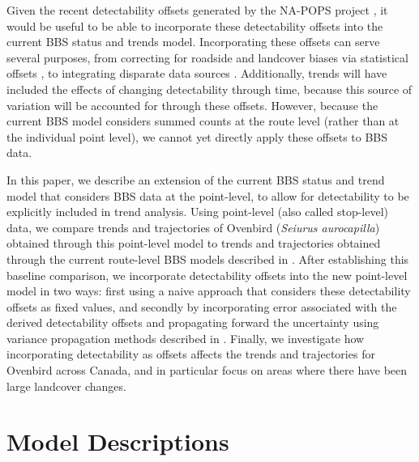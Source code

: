 \documentclass[12pt]{article}
\begin{document}
Given the recent detectability offsets generated by the NA-POPS project \citep{edwards_point_2023}, it would be useful to be able to incorporate these detectability offsets into the current BBS status and trends model. 
Incorporating these offsets can serve several purposes, from correcting for roadside and landcover biases via statistical offsets \citep{thogmartin_sensitivity_2010, solymos_lessons_2020, edwards_point_2023}, to integrating disparate data sources \citep{solymos_calibrating_2013, edwards_point_2023}.
Additionally, trends will have included the effects of changing detectability through time, because this source of variation will be accounted for through these offsets.
However, because the current BBS model considers summed counts at the route level (rather than at the individual point level), we cannot yet directly apply these offsets to BBS data. 

\par In this paper, we describe an extension of the current BBS status and trend model \citep{smith_spatially_2023} that considers BBS data at the point-level, to allow for detectability to be explicitly included in trend analysis. 
Using point-level (also called stop-level) data, we compare trends and trajectories of Ovenbird (\textit{Seiurus aurocapilla}) obtained through this point-level model to trends and trajectories obtained through the current route-level BBS models described in \citet{smith_spatially_2023}.
After establishing this baseline comparison, we incorporate detectability offsets into the new point-level model in two ways: first using a naive approach that considers these detectability offsets as fixed values, and secondly by incorporating error associated with the derived detectability offsets and propagating forward the uncertainty using variance propagation methods described in \citet{bravington_variance_2021}.
Finally, we investigate how incorporating detectability as offsets affects the trends and trajectories for Ovenbird across Canada, and in particular focus on areas where there have been large landcover changes.

\section{Model Descriptions}
\end{document}
